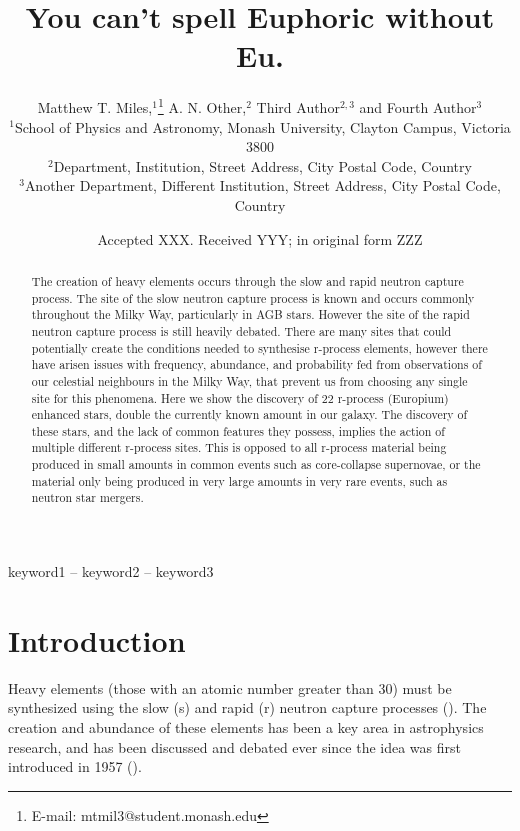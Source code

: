 \documentclass[a4paper,fleqn,usenatbib]{mnras}
\title[Research is fun, max. 45 characters]{You can't spell Euphoric without Eu.}
\author[Matthew T. Miles et al.]{
Matthew T. Miles,$^{1}$\thanks{E-mail: mtmil3@student.monash.edu}
A. N. Other,$^{2}$
Third Author$^{2,3}$
and Fourth Author$^{3}$
\\
$^{1}$School of Physics and Astronomy, Monash University, Clayton Campus, Victoria 3800\\
$^{2}$Department, Institution, Street Address, City Postal Code, Country\\
$^{3}$Another Department, Different Institution, Street Address, City Postal Code, Country
}
\date{Accepted XXX. Received YYY; in original form ZZZ}
\begin{document}
\label{firstpage}
\pagerange{\pageref{firstpage}--\pageref{lastpage}}
\maketitle

\begin{abstract}
The creation of heavy elements occurs through the slow and rapid neutron capture process. The site of the slow neutron capture process is known and occurs commonly throughout the Milky Way, particularly in AGB stars. However the site of the rapid neutron capture process is still heavily debated. There are many sites that could potentially create the conditions needed to synthesise r-process elements, however there have arisen issues with frequency, abundance, and probability fed from observations of our celestial neighbours in the Milky Way, that prevent us from choosing any single site for this phenomena. Here we show the discovery of 22 r-process (Europium) enhanced stars, double the currently known amount in our galaxy. The discovery of these stars, and the lack of common features they possess, implies the action of multiple different r-process sites. This is opposed to all r-process material being produced in small amounts in common events such as core-collapse supernovae, or the material only being produced in very large amounts in very rare events, such as neutron star mergers. 
\end{abstract}

\begin{keywords}
keyword1 -- keyword2 -- keyword3
\end{keywords}


\section{Introduction}

Heavy elements (those with an atomic number greater than 30) must be synthesized using the slow (s) and rapid (r) neutron capture processes (\cite{Sneden2008}). The creation and abundance of these elements has been a key area in astrophysics research, and has been discussed and debated ever since the idea was first introduced in 1957 (\cite{Burbidge1957}). 
\end{document}
